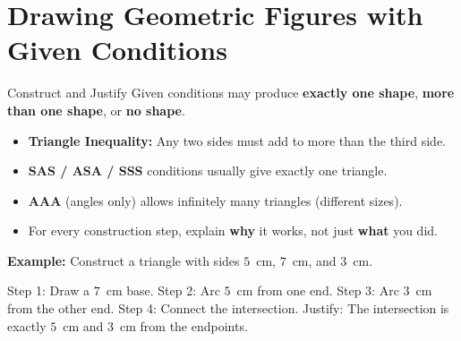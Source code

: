 \section{Drawing Geometric Figures with Given Conditions}

\begin{quickReview}{Construct and Justify}
Given conditions may produce \textbf{exactly one shape}, \textbf{more than one shape}, or \textbf{no shape}.

\begin{itemize}[leftmargin=*]
    \item \textbf{Triangle Inequality:} Any two sides must add to more than the third side.
    \item \textbf{SAS / ASA / SSS} conditions usually give exactly one triangle.
    \item \textbf{AAA} (angles only) allows infinitely many triangles (different sizes).
    \item For every construction step, explain \textbf{why} it works, not just \textbf{what} you did.
\end{itemize}

\medskip
\textbf{Example:} Construct a triangle with sides $5$~cm, $7$~cm, and $3$~cm.

Step 1: Draw a $7$~cm base. Step 2: Arc $5$~cm from one end. Step 3: Arc $3$~cm from the other end. Step 4: Connect the intersection. Justify: The intersection is exactly $5$~cm and $3$~cm from the endpoints.
\end{quickReview}

